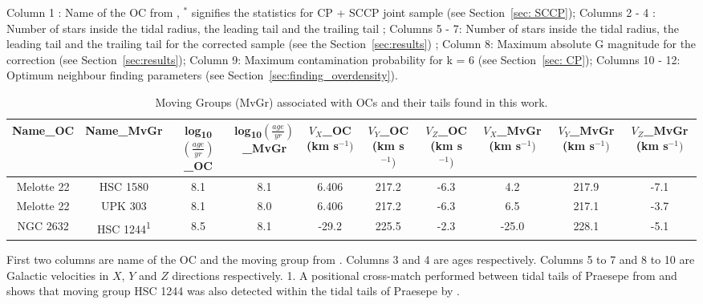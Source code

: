 \documentclass{aa}
\begin{document}
\begin{appendix}
\begin{landscape}
\begin{table}
\begin{tabular}{c c c c c c c c c c c c }
\hline                                          
\end{tabular}
\vspace{0.5 cm}
  \par \textit{} Column 1 : Name of the OC from , $^*$ signifies the statistics for CP + SCCP joint sample (see Section~\ref{sec: SCCP}); Columns 2 - 4 : Number of stars inside the tidal radius, the leading tail and the trailing tail ; Columns 5 - 7: Number of stars inside the tidal radius, the leading tail and the trailing tail for the corrected sample (see the Section~\ref{sec:results})  ; Column 8: Maximum absolute G magnitude for the correction (see Section~\ref{sec:results}); Column 9: Maximum contamination probability for k = 6 (see Section~\ref{sec: CP}); Columns 10 - 12: Optimum neighbour finding parameters (see Section~\ref{sec:finding_overdensity}).

\end{table}

\begin{table}[h!]
  
  \caption{Moving Groups (MvGr) associated with OCs and their tails found in this work.} 
  \label{Table: Moving_Groups} 
  \begin{tabular}{c c c c c c c c c c}      
  
  \hline\hline                       
   Name\_OC & Name\_{MvGr} & log\textsubscript{10}$(\frac{age}{yr})$\_OC & log\textsubscript{10}$(\frac{age}{yr})$\_{MvGr} & $V_X$\_OC (km s$^{-1})$& $V_Y$\_OC (km s$^{-1})$& $V_Z$\_OC (km s$^{-1})$& $V_X$\_{MvGr} (km s$^{-1})$ & $V_Y$\_{MvGr} (km s$^{-1})$ & $V_Z$\_{MvGr} (km s$^{-1})$\\ 
   \hline     
   Melotte 22 & HSC 1580 &  8.1 & 8.1 &  6.406 & 217.2 & -6.3 & 4.2 & 217.9 & -7.1  \\ 
   Melotte 22 & UPK 303 &  8.1 & 8.0 &  6.406 & 217.2 & -6.3 & 6.5 & 217.1 & -3.7  \\
   NGC 2632 & HSC 1244\textsuperscript{1} &  8.5 & 8.1  & -29.2 & 225.5 & -2.3 & -25.0 & 228.1 & -5.1  \\
       
   \hline
  \end{tabular}
  \vspace{0.5 cm}
  \par \textit{} First two columns are name of the OC and the moving group from . Columns 3 and 4 are ages respectively. Columns 5 to 7 and 8 to 10 are Galactic velocities in $X$, $Y$ and $Z$ directions respectively. 
  1. A positional cross-match performed between tidal tails of Praesepe from  and  shows that moving group HSC 1244 was also detected within the tidal tails of Praesepe by .


\end{table}
\end{landscape}
\end{appendix}
\end{document}

